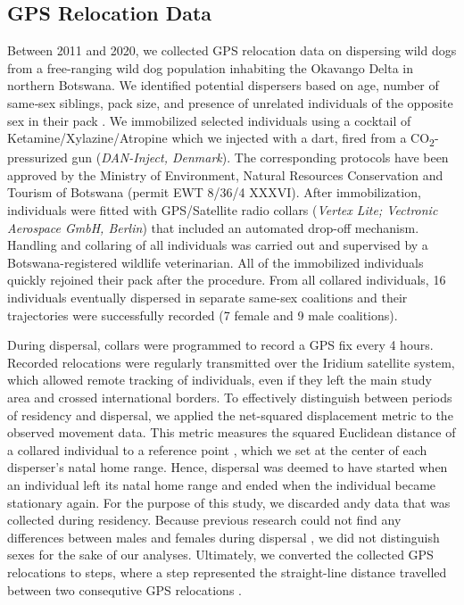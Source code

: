 \documentclass[abstract=on,10pt,a4paper,bibliography=totocnumbered]{article}
\begin{document}
\subsection{GPS Relocation Data}
Between 2011 and 2020, we collected GPS relocation data on dispersing wild dogs
from a free-ranging wild dog population inhabiting the Okavango Delta in
northern Botswana. We identified potential dispersers based on age, number of
same‐sex siblings, pack size, and presence of unrelated individuals of the
opposite sex in their pack \citep{McNutt.1996, Behr.2020}. We immobilized
selected individuals using a cocktail of Ketamine/Xylazine/Atropine
\citep{Osofsky.1996, Cozzi.2020} which we injected with a dart, fired from a
CO\textsubscript{2}-pressurized gun (\textit{DAN-Inject, Denmark}). The
corresponding protocols have been approved by the Ministry of Environment,
Natural Resources Conservation and Tourism of Botswana (permit EWT 8/36/4
XXXVI). After immobilization, individuals were fitted with GPS/Satellite radio
collars (\textit{Vertex Lite; Vectronic Aerospace GmbH, Berlin}) that included
an automated drop-off mechanism. Handling and collaring of all individuals was
carried out and supervised by a Botswana-registered wildlife veterinarian. All
of the immobilized individuals quickly rejoined their pack after the procedure.
From all collared individuals, 16 individuals eventually dispersed in separate
same-sex coalitions and their trajectories were successfully recorded (7 female
and 9 male coalitions).

During dispersal, collars were programmed to record a GPS fix every 4 hours.
Recorded relocations were regularly transmitted over the Iridium satellite
system, which allowed remote tracking of individuals, even if they left the main
study area and crossed international borders. To effectively distinguish between
periods of residency and dispersal, we applied the net-squared displacement
metric to the observed movement data. This metric measures the squared Euclidean
distance of a collared individual to a reference point \citep{Borger.2012},
which we set at the center of each disperser's natal home range. Hence,
dispersal was deemed to have started when an individual left its natal home
range and ended when the individual became stationary again. For the purpose of
this study, we discarded andy data that was collected during residency. Because
previous research could not find any differences between males and females
during dispersal \citep{Woodroffe.2019, Cozzi.2020}, we did not distinguish
sexes for the sake of our analyses. Ultimately, we converted the collected GPS
relocations to steps, where a step represented the straight-line distance
travelled between two consequtive GPS relocations \citep{Turchin.1998}.
\end{document}
